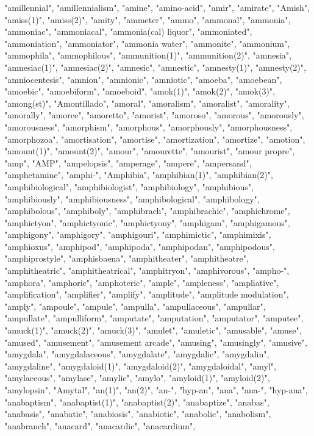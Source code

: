 "amillennial",
"amillennialism",
"amine",
"amino-acid",
"amir",
"amirate",
"Amish",
"amiss(1)",
"amiss(2)",
"amity",
"ammeter",
"ammo",
"ammonal",
"ammonia",
"ammoniac",
"ammoniacal",
"ammonia(cal) liquor",
"ammoniated",
"ammoniation",
"ammoniator",
"ammonia water",
"ammonite",
"ammonium",
"ammophila",
"ammophilous",
"ammunition(1)",
"ammunition(2)",
"amnesia",
"amnesiac(1)",
"amnesiac(2)",
"amnesic",
"amnestic",
"amnesty(1)",
"amnesty(2)",
"amniocentesis",
"amnion",
"amnionic",
"amniotic",
"amoeba",
"amoebean",
"amoebic",
"amoebiform",
"amoeboid",
"amok(1)",
"amok(2)",
"amok(3)",
"among(st)",
"Amontillado",
"amoral",
"amoralism",
"amoralist",
"amorality",
"amorally",
"amorce",
"amoretto",
"amorist",
"amoroso",
"amorous",
"amorously",
"amorousness",
"amorphism",
"amorphous",
"amorphously",
"amorphousness",
"amorphozoa",
"amortisation",
"amortise",
"amortization",
"amortize",
"amotion",
"amount(1)",
"amount(2)",
"amour",
"amourette",
"amourist",
"amour propre",
"amp",
"AMP",
"ampelopsis",
"amperage",
"ampere",
"ampersand",
"amphetamine",
"amphi-",
"Amphibia",
"amphibian(1)",
"amphibian(2)",
"amphibiological",
"amphibiologist",
"amphibiology",
"amphibious",
"amphibiously",
"amphibiousness",
"amphibological",
"amphibology",
"amphibolous",
"amphiboly",
"amphibrach",
"amphibrachic",
"amphichrome",
"amphictyon",
"amphictyonic",
"amphictyony",
"amphigam",
"amphigamous",
"amphigony",
"amphigory",
"amphigouri",
"amphimictic",
"amphimixis",
"amphioxus",
"amphipod",
"amphipoda",
"amphipodan",
"amphipodous",
"amphiprostyle",
"amphisbaena",
"amphitheater",
"amphitheatre",
"amphitheatric",
"amphitheatrical",
"amphitryon",
"amphivorous",
"ampho-",
"amphora",
"amphoric",
"amphoteric",
"ample",
"ampleness",
"ampliative",
"amplification",
"amplifier",
"amplify",
"amplitude",
"amplitude modulation",
"amply",
"ampoule",
"ampule",
"ampulla",
"ampullaceous",
"ampullar",
"ampullate",
"ampulliform",
"amputate",
"amputation",
"amputator",
"amputee",
"amuck(1)",
"amuck(2)",
"amuck(3)",
"amulet",
"amuletic",
"amusable",
"amuse",
"amused",
"amusement",
"amusement arcade",
"amusing",
"amusingly",
"amusive",
"amygdala",
"amygdalaceous",
"amygdalate",
"amygdalic",
"amygdalin",
"amygdaline",
"amygdaloid(1)",
"amygdaloid(2)",
"amygdaloidal",
"amyl",
"amylaceous",
"amylase",
"amylic",
"amylo",
"amyloid(1)",
"amyloid(2)",
"amylopsin",
"Amytal",
"an(1)",
"an(2)",
"an-",
"hyp-an",
"ana",
"ana-",
"hyp-ana",
"anabaptism",
"anabaptist(1)",
"anabaptist(2)",
"anabaptize",
"anabas",
"anabasis",
"anabatic",
"anabiosis",
"anabiotic",
"anabolic",
"anabolism",
"anabranch",
"anacard",
"anacardic",
"anacardium",
